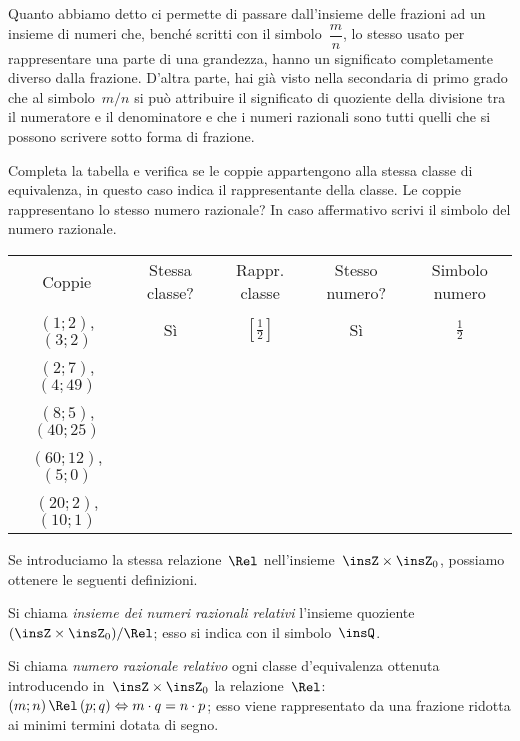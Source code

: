 Quanto abbiamo detto ci permette di passare dall'insieme delle frazioni ad un insieme di numeri che, benché scritti con il simbolo~$\dfrac{m}{n}$,
lo stesso usato per rappresentare una parte di una grandezza, hanno un significato completamente diverso dalla frazione.
D'altra parte, hai già visto nella secondaria di primo grado che al simbolo~$m/n$ si può attribuire il significato di quoziente della
divisione tra il numeratore e il denominatore e che i numeri razionali sono tutti quelli che si possono scrivere sotto forma di frazione.

\begin{exrig}
 \begin{esempio}
Completa la tabella e verifica se le coppie appartengono alla stessa classe di equivalenza, in questo caso indica il rappresentante della classe.
Le coppie rappresentano lo stesso numero razionale? In caso affermativo scrivi il simbolo del numero razionale.
\begin{center}
 \begin{tabular}{ccccc}
 \toprule
  Coppie & Stessa classe? & Rappr. classe & Stesso numero? & Simbolo numero\\
  $(1;2)$, $(3;2)$ & Sì &$\left[\frac{1}{2}\right]$ & Sì & $\frac{1}{2}$\\
  $(2;7)$, $(4;49)$ & & & & \\
  $(8;5)$, $(40;25)$ & & & & \\
  $(60;12)$, $(5;0)$ & & & & \\
  $(20;2)$, $(10;1)$ & & & & \\
  \bottomrule
 \end{tabular}
\end{center}
 \end{esempio}
\end{exrig}

\conclusione Se introduciamo la stessa relazione~$\Rel$ nell'insieme~$\insZ\times\insZ_{0}$, possiamo ottenere le seguenti definizioni.
\begin{definizione}
Si chiama \emph{insieme dei numeri razionali relativi} l'insieme quoziente~$(\insZ\times\insZ_{0})/\Rel$; esso si indica con il simbolo~$\insQ$.
\end{definizione}

\begin{definizione}
Si chiama \emph{numero razionale relativo} ogni classe d'equivalenza ottenuta introducendo in~$\insZ\times\insZ_{0}$ la relazione~$\Rel$:
$(m;n)\,\Rel\, (p;q) \Leftrightarrow m\cdot q=n\cdot p$; esso viene rappresentato da una frazione ridotta ai minimi termini dotata di segno.
\end{definizione}

